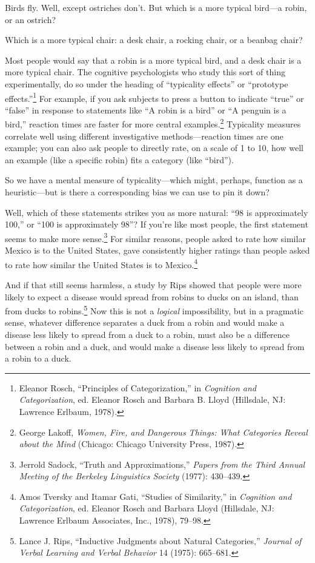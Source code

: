 {{{
 Birds fly. Well, except ostriches don't. But which
is a more typical bird---a robin, or an ostrich? }

{
 Which is a more typical chair: a desk chair, a rocking chair, or a
beanbag chair?}

{
 Most people would say that a robin is a more typical bird, and a
desk chair is a more typical chair. The cognitive psychologists who
study this sort of thing experimentally, do so under the heading of
``typicality effects'' or
``prototype
effects.''\footnote{Eleanor Rosch, ``Principles of
Categorization,'' in \textit{Cognition and
Categorization}, ed. Eleanor Rosch and Barbara B. Lloyd (Hillsdale, NJ:
Lawrence Erlbaum, 1978).} For example, if you ask
subjects to press a button to indicate
``true'' or
``false'' in response to statements
like ``A robin is a bird'' or
``A penguin is a bird,'' reaction
times are faster for more central examples.\footnote{George Lakoff, \textit{Women, Fire, and Dangerous Things: What
Categories Reveal about the Mind} (Chicago: Chicago University Press,
1987).}
Typicality measures correlate well using different investigative
methods---reaction times are one example; you can also ask people to
directly rate, on a scale of 1 to 10, how well an example (like a
specific robin) fits a category (like
``bird'').}

{
 So we have a mental measure of typicality---which might, perhaps,
function as a heuristic---but is there a corresponding bias we can use
to pin it down?}

{
 Well, which of these statements strikes you as more natural:
``98 is approximately 100,'' or
``100 is approximately 98''? If
you're like most people, the first statement seems to
make more sense.\footnote{Jerrold Sadock, ``Truth and
Approximations,'' \textit{Papers from the Third
Annual Meeting of the Berkeley Linguistics Society} (1977): 430--439.} For similar reasons, people asked
to rate how similar Mexico is to the United States, gave consistently
higher ratings than people asked to rate how similar the United States
is to Mexico.\footnote{Amos Tversky and Itamar Gati, ``Studies of
Similarity,'' in \textit{Cognition and
Categorization}, ed. Eleanor Rosch and Barbara Lloyd (Hillsdale, NJ:
Lawrence Erlbaum Associates, Inc., 1978), 79--98.}}

{
 And if that still seems harmless, a study by Rips showed that
people were more likely to expect a disease would spread from robins to
ducks on an island, than from ducks to robins.\footnote{Lance J. Rips, ``Inductive Judgments about
Natural Categories,'' \textit{Journal of Verbal
Learning and Verbal Behavior} 14 (1975): 665--681.} Now
this is not a \textit{logical} impossibility, but in a pragmatic sense,
whatever difference separates a duck from a robin and would make a
disease less likely to spread from a duck to a robin, must also be a
difference between a robin and a duck, and would make a disease less
likely to spread from a robin to a duck.}

}}
